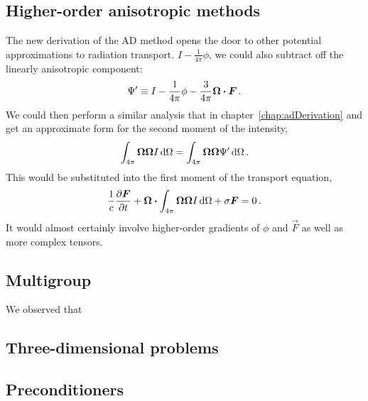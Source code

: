 \subsection{Higher-order anisotropic \texorpdfstring{\PN}{PN} methods}
The new derivation of the AD method opens the door to other potential
approximations to radiation transport.  $I -
\frac{1}{4\pi}\phi$, we could also subtract off the linearly anisotropic
component:
\begin{equation*}
  \Psi' \equiv I - \frac{1}{4\pi}\phi - \frac{3}{4\pi} \bm{\Omega} \bm{\cdot}
  \bm{F}\,.
\end{equation*}
We could then perform a similar analysis that in chapter~\ref{chap:adDerivation}
and get an approximate form for the second moment of the intensity,
\begin{equation*}
  \int_{4\pi} \bm{\Omega}\bm{\Omega} I \mathop{}\!\mathrm{d} \Omega
  = \int_{4\pi} \bm{\Omega}\bm{\Omega} \Psi' \mathop{}\!\mathrm{d} \Omega \,.
\end{equation*}
This would be substituted into the first moment of the transport equation,
\begin{equation*}
  \frac{1}{c}\frac{\partial \bm{F}}{\partial t}
  + \bm{\Omega} \bm{\cdot} \int_{4\pi} \bm{\Omega}\bm{\Omega} I \mathop{}\!\mathrm{d} \Omega
  + \sigma \bm{F}
  = 0 \,.
\end{equation*}
It would almost certainly involve higher-order gradients of $\phi$ and $\vec{F}$
as well as more complex tensors.

\subsection{Multigroup}

We observed that 

\subsection{Three-dimensional problems}

\subsection{Preconditioners}

